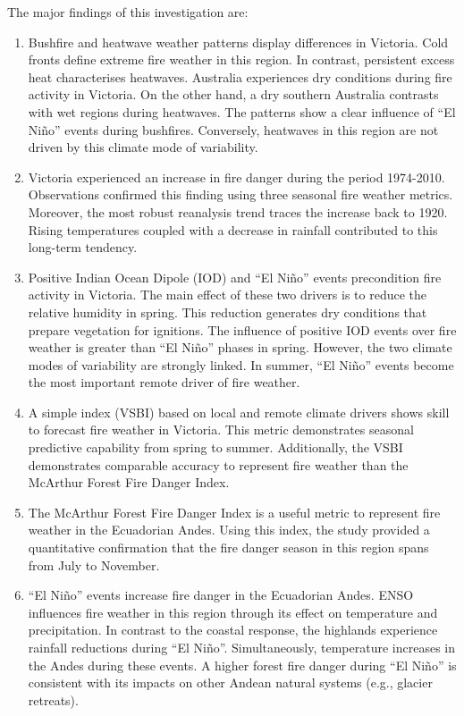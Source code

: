 The major findings of this investigation are:
\begin{enumerate}
\item Bushfire and heatwave weather patterns display differences in Victoria.
Cold fronts define extreme fire weather in this region. In contrast,
persistent excess heat characterises heatwaves. Australia experiences
dry conditions during fire activity in Victoria. On the other hand,
a dry southern Australia contrasts with wet regions during heatwaves.
The patterns show a clear influence of ``El Ni\~no'' events during
bushfires. Conversely, heatwaves in this region are not driven by
this climate mode of variability. 
\item Victoria experienced an increase in fire danger during the period
1974-2010. Observations confirmed this finding using three seasonal
fire weather metrics. Moreover, the most robust reanalysis trend traces
the increase back to 1920. Rising temperatures coupled with a decrease
in rainfall contributed to this long-term tendency.
\item Positive Indian Ocean Dipole (IOD) and ``El Ni\~no'' events precondition
fire activity in Victoria. The main effect of these two drivers is
to reduce the relative humidity in spring. This reduction generates
dry conditions that prepare vegetation for ignitions. The influence
of positive IOD events over fire weather is greater than ``El Ni\~no''
phases in spring. However, the two climate modes of variability are
strongly linked. In summer, ``El Ni\~no'' events become the most important
remote driver of fire weather.
\item A simple index (VSBI) based on local and remote climate drivers shows
skill to forecast fire weather in Victoria. This metric demonstrates
seasonal predictive capability from spring to summer. Additionally,
the VSBI demonstrates comparable accuracy to represent fire weather
than the McArthur Forest Fire Danger Index.
\item The McArthur Forest Fire Danger Index is a useful metric to represent
fire weather in the Ecuadorian Andes. Using this index, the study
provided a quantitative confirmation that the fire danger season in
this region spans from July to November. 
\item ``El Ni\~no'' events increase fire danger in the Ecuadorian Andes.
ENSO influences fire weather in this region through its effect on
temperature and precipitation. In contrast to the coastal response,
the highlands experience rainfall reductions during ``El Ni\~no''.
Simultaneously, temperature increases in the Andes during these events.
A higher forest fire danger during ``El Ni\~no'' is consistent with
its impacts on other Andean natural systems (e.g., glacier retreats).
\end{enumerate}

